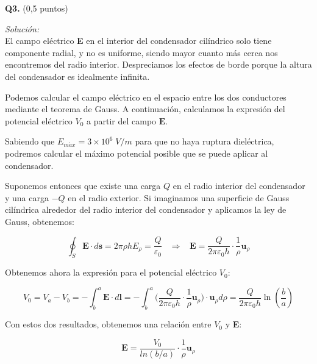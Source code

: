 \textbf{Q3.} (0,5 puntos)


\vspace{20px}
\textit{Solución:}
\\

El campo eléctrico \textbf{E} en el interior del condensador cilíndrico solo tiene componente radial, y no es uniforme, siendo mayor
cuanto más cerca nos encontremos del radio interior. Despreciamos los efectos de borde porque la altura del condensador es idealmente infinita.

Podemos calcular el campo eléctrico en el espacio entre los dos conductores mediante el teorema de Gauss. A continuación, calculamos
la expresión del potencial eléctrico $V_0$ a partir del campo $\mathbf{E}$.

Sabiendo que $E_{m\acute ax} = 3 \times 10^6\;V / m$ para que no haya ruptura dieléctrica, podremos calcular el máximo potencial posible que se
puede aplicar al condensador.

Suponemos entonces que existe una carga $Q$ en el radio interior del condensador y una carga $-Q$ en el radio exterior. Si imaginamos una
superficie de Gauss cilíndrica alrededor del radio interior del condensador y aplicamos la ley de Gauss, obtenemos:

\begin{equation*}
    \oint_{S} \mathbf{E} \cdot d\mathbf{s} = 2 \pi \rho h E_{\rho} = \frac{Q}{\varepsilon_0}
    \hspace{10pt} \Rightarrow \hspace{10pt}  \mathbf{E} = \frac{Q}{2 \pi \varepsilon_0 h}\cdot \frac{1}{\rho} \mathbf{u}_{\rho}
\end{equation*}

Obtenemos ahora la expresión para el potencial eléctrico $V_0$:

\begin{equation*}
    V_0 = V_{a} - V_{b} = - \int_{b}^{a} \mathbf{E} \cdot d\mathbf{l} =
    - \int_{b}^{a} \biggl( \frac{Q}{2 \pi \varepsilon_0 h}\cdot \frac{1}{\rho} \mathbf{u}_{\rho} \biggr) \cdot \mathbf{u}_{\rho} d\rho
    =  \frac{Q}{2 \pi \varepsilon_0 h} \ln(\frac{b}{a})
\end{equation*}

Con estos dos resultados, obtenemos una relación entre $V_0$ y \textbf{E}:

\begin{equation*}
    \mathbf{E} = \frac{V_0}{ln(b/a)} \cdot \frac{1}{\rho} \mathbf{u}_{\rho}
\end{equation*}


